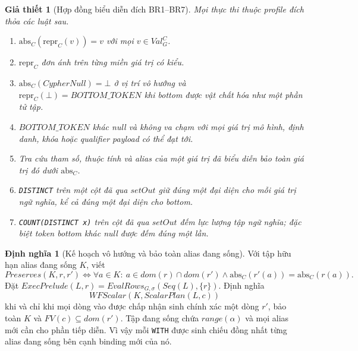 \documentclass[11pt,a4paper]{article}
\newtheorem{assumption}{Giả thiết}
\theoremstyle{definition}
\newtheorem{definition}{Định nghĩa}
\newcommand{\reprC}{\mathrm{repr}_{C}}
\newcommand{\absC}{\mathrm{abs}_{C}}
\begin{document}
\begin{assumption}[Hợp đồng biểu diễn đích BR1--BR7]
Mọi thực thi thuộc profile đích thỏa các luật sau.
\begin{enumerate}[label=(BR\arabic*)]
  \item $\absC(\reprC(v))=v$ với mọi $v\in Val_G^C$.
  \item $\reprC$ đơn ánh trên từng miền giá trị có kiểu.
  \item $\absC(CypherNull)=\bot$ ở vị trí vô hướng và
  $\reprC(\bot)=BOTTOM\_TOKEN$ khi bottom được vật chất hóa như một phần tử tập.
  \item $BOTTOM\_TOKEN$ khác null và không va chạm với mọi giá trị mô hình,
  định danh, khóa hoặc qualifier payload có thể đạt tới.
  \item Tra cứu tham số, thuộc tính và alias của một giá trị đã biểu diễn bảo
  toàn giá trị đó dưới $\absC$.
  \item \texttt{DISTINCT} trên một cột đã qua $setOut$ giữ đúng một đại diện
  cho mỗi giá trị ngữ nghĩa, kể cả đúng một đại diện cho bottom.
  \item \texttt{COUNT(DISTINCT x)} trên cột đã qua $setOut$ đếm lực lượng tập
  ngữ nghĩa; đặc biệt token bottom khác null được đếm đúng một lần.
\end{enumerate}
\end{assumption}

\begin{definition}[Kế hoạch vô hướng và bảo toàn alias đang sống]
Với tập hữu hạn alias đang sống $K$, viết
\[
Preserves(K,r,r')\iff
\forall a\in K:\ a\in dom(r)\cap dom(r')\land
\absC(r'(a))=\absC(r(a)).
\]
Đặt $ExecPrelude(L,r)=EvalRows_{G,\sigma}(Seq(L),\{r\})$. Định nghĩa
\[
WFScalar(K,ScalarPlan(L,c))
\]
khi và chỉ khi mọi dòng vào được chấp nhận sinh chính xác một dòng $r'$, bảo
toàn $K$ và $FV(c)\subseteq dom(r')$. Tập đang sống chứa $range(\alpha)$ và mọi
alias mới cần cho phần tiếp diễn. Vì vậy mỗi \texttt{WITH} được sinh chiếu đồng
nhất từng alias đang sống bên cạnh binding mới của nó.
\end{definition}
\end{document}
